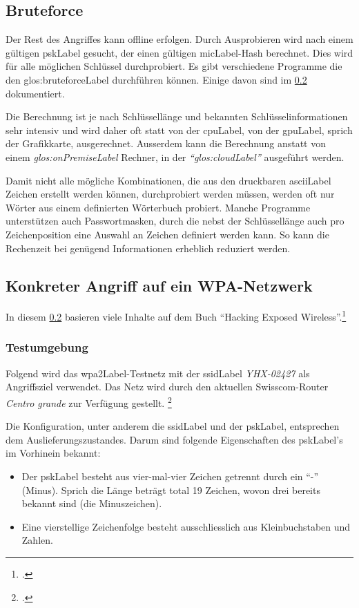 \subsection{Bruteforce}
Der Rest des Angriffes kann offline erfolgen. Durch Ausprobieren wird nach einem gültigen \gls{pskLabel} gesucht, der einen gültigen \gls{micLabel}-Hash berechnet. Dies wird für alle möglichen Schlüssel durchprobiert.
Es gibt verschiedene Programme die den \gls{glos:bruteforceLabel} durchführen können.
Einige davon sind im \cref{subsec:wpa_attack_tutorial} dokumentiert.

Die Berechnung ist je nach Schlüssellänge und bekannten Schlüsselinformationen sehr intensiv und wird daher oft statt von der \gls{cpuLabel}, von der \gls{gpuLabel}, sprich der Grafikkarte, ausgerechnet.
Ausserdem kann die Berechnung anstatt von einem \textit{\gls{glos:onPremiseLabel}} Rechner, in der \textit{"`\gls{glos:cloudLabel}"'} ausgeführt werden.

Damit nicht alle mögliche Kombinationen, die aus den druckbaren \gls{asciiLabel} Zeichen erstellt werden können, durchprobiert werden müssen, werden oft nur Wörter aus einem definierten Wörterbuch probiert.
Manche Programme unterstützen auch Passwortmasken, durch die nebst der Schlüssellänge auch pro Zeichenposition eine Auswahl an Zeichen definiert werden kann. So kann die Rechenzeit bei genügend Informationen erheblich reduziert werden.


\subsection{Konkreter Angriff auf ein WPA-Netzwerk}
\label{subsec:wpa_attack_tutorial}

In diesem \cref{subsec:wpa_attack_tutorial} basieren viele Inhalte auf dem Buch "`Hacking Exposed Wireless"'.\footcite[][148f.]{WrightCache201503}

\subsubsection{Testumgebung}
\label{subsubsec:wpa_test_environment}

Folgend wird das \gls{wpa2Label}-Testnetz mit der \gls{ssidLabel} \textit{YHX-02427} als Angriffsziel verwendet.
Das Netz wird durch den aktuellen Swisscom-Router \textit{Centro grande} zur Verfügung gestellt. \footcite{Centro_grande_Analog_Standard_-_WLAN_Router_Swisscom_2015-04-15}

Die Konfiguration, unter anderem die \gls{ssidLabel} und der \gls{pskLabel}, entsprechen dem Auslieferungszustandes.
Darum sind folgende Eigenschaften des \gls{pskLabel}'s im Vorhinein bekannt:
\begin{itemize}
	\item Der \gls{pskLabel} besteht aus vier-mal-vier Zeichen getrennt durch ein "`-"' (Minus). Sprich die Länge beträgt total 19 Zeichen, wovon drei bereits bekannt sind (die Minuszeichen).
	\item Eine vierstellige Zeichenfolge besteht ausschliesslich aus Kleinbuchstaben und Zahlen.
\end{itemize}


